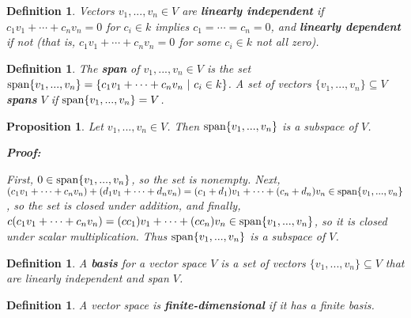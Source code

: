 \documentclass{article}
\theoremstyle{colontheorem}
\newtheorem{proposition}[theorem]{Proposition}
\newtheorem{definition}[theorem]{Definition}
\newcommand{\Span}{\textnormal{span}}
\newenvironment{Proposition}
{
	\begin{mdframed}[backgroundcolor=TheoremOrange!10]
	\begin{proposition}
}
{
	\end{proposition}
	\end{mdframed}
	
	\vspace{.15in}
}
\newenvironment{Def}
{
	\begin{mdframed}[backgroundcolor=DefGreen!10]
	\begin{definition}
}
{
	\end{definition}
	\end{mdframed}
	
	\vspace{.15in}
}
\newenvironment{Proof}
{
	\begin{mdframed}[backgroundcolor=ProofPurple!10]
	\textbf{Proof:}%
}
{
	\end{mdframed}
	
	\vspace{.085in}
}
\begin{document}
\begin{Def}
	
	Vectors $v_1, ..., v_n \in V$ are \textbf{linearly independent} if $c_1 v_1 + \cdots + c_n v_n = 0$ for $c_i \in k$ implies $c_1 = \cdots = c_n = 0$, and \textbf{linearly dependent} if not (that is, $c_1 v_1 + \cdots + c_n v_n = 0$ for some $c_i \in k$ not all zero).
	
\end{Def}



\begin{Def}
	
	The \textbf{span} of $v_1, ..., v_n \in V$ is the set $\Span \{v_1, ..., v_n\} = \{c_1 v_1 + \cdots + c_n v_n\ |\ c_i \in k\}$. A set of vectors $\{v_1, ..., v_n\} \subseteq V$ \textbf{spans} $V$ if $\Span \{v_1, ..., v_n\} = V$.
	
\end{Def}



\begin{Proposition}
	
	Let $v_1, ..., v_n \in V$. Then $\Span \{v_1, ..., v_n\}$ is a subspace of $V$.
	
	\begin{Proof}
		First, $0 \in \Span \{v_1, ..., v_n\}$, so the set is nonempty. Next, $(c_1 v_1 + \cdots + c_n v_n) + (d_1 v_1 + \cdots + d_n v_n) = (c_1 + d_1) v_1 + \cdots + (c_n + d_n) v_n \in \Span \{v_1, ..., v_n\}$, so the set is closed under addition, and finally, $c(c_1 v_1 + \cdots + c_n v_n) = (c c_1) v_1 + \cdots + (c c_n) v_n \in \Span \{v_1, ..., v_n\}$, so it is closed under scalar multiplication. Thus $\Span \{v_1, ..., v_n\}$ is a subspace of $V$.
		
	\end{Proof}
	
\end{Proposition}



\begin{Def}
	
	A \textbf{basis} for a vector space $V$ is a set of vectors $\{v_1, ..., v_n\} \subseteq V$ that are linearly independent and span $V$.
	
\end{Def}



\begin{Def}
	
	A vector space is \textbf{finite-dimensional} if it has a finite basis.
	
\end{Def}
\end{document}
